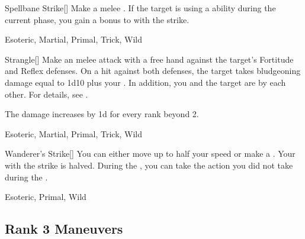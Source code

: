 \lowercase{\hypertarget{maneuver:Spellbane Strike}{}}\label{maneuver:Spellbane Strike}
\hypertarget{maneuver:Spellbane Strike}{}
\begin{freeability}[Rank 2]{Spellbane Strike}[]
Make a melee .
If the target is using a  ability during the current phase, you gain a  bonus to  with the strike.


 Esoteric, Martial, Primal, Trick, Wild
\end{freeability}
\vspace{0.25em}



\lowercase{\hypertarget{maneuver:Strangle}{}}\label{maneuver:Strangle}
\hypertarget{maneuver:Strangle}{}
\begin{freeability}[Rank 2]{Strangle}[]
Make an melee attack with a free hand against the target's Fortitude and Reflex defenses.
On a hit against both defenses, the target takes bludgeoning damage equal to 1d10 plus your .
In addition, you and the target are  by each other.
For details, see .

\rankline
The damage increases by \plus1d for every rank beyond 2.


 Esoteric, Martial, Primal, Trick, Wild
\end{freeability}
\vspace{0.25em}



\lowercase{\hypertarget{maneuver:Wanderer's Strike}{}}\label{maneuver:Wanderer's Strike}
\hypertarget{maneuver:Wanderer's Strike}{}
\begin{freeability}[Rank 2]{Wanderer's Strike}[]
You can either move up to half your speed or make a .
Your  with the strike is halved.
During the , you can take the action you did not take during the .


 Esoteric, Primal, Wild
\end{freeability}
\vspace{0.25em}


\subsection{Rank 3 Maneuvers}

